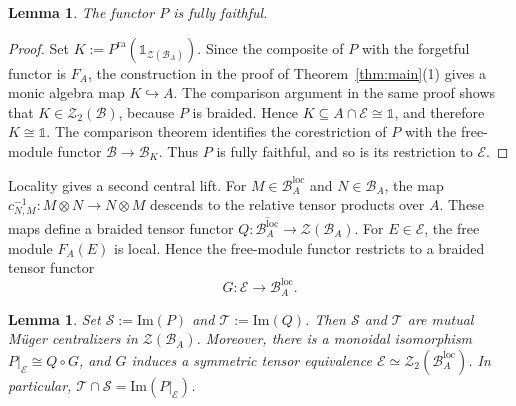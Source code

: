 \documentclass[10pt,a4paper]{amsart}
\numberwithin{equation}{section}
\newtheorem{lemma}[thmctr]{Lemma}
\newcommand{\unit}{\mathds{1}}
\newcommand{\B}{\mathcal{B}}
\newcommand{\C}{\mathcal{C}}
\newcommand{\E}{\mathcal{E}}
\newcommand{\Z}{\mathcal{Z}}
\newcommand{\T}{\mathcal{T}}
\newcommand{\cS}{\mathcal{S}}
\newcommand{\loc}{\mathrm{loc}}
\newcommand{\ra}{\mathrm{ra}}
\newcommand{\im}{\mathrm{Im}}
\begin{document}
\begin{lemma}\label{lem:relative-positive-lift}
The functor $P$ is fully faithful. 
\end{lemma}

\begin{proof}
Set $K:=P^{\ra}(\unit_{\Z(\B_A)})$. Since the composite of $P$ with the
forgetful functor is $F_A$, the construction in the proof of
Theorem~\ref{thm:main}(1) gives a monic algebra map $K\hookrightarrow A$.
The comparison argument in the same proof shows that $K\in\Z_2(\B)$,
because $P$ is braided. Hence $K\subseteq A\cap\E\cong\unit$, and therefore
$K\cong\unit$. The comparison theorem
\cite[Proposition~6.6]{shimizu2026commutative} identifies the corestriction
of $P$ with the free-module functor $\B\to\B_K$. Thus $P$ is fully faithful,
and so is its restriction to $\E$.
\end{proof}

Locality gives a second central lift. For $M\in\B_A^\loc$ and $N\in\B_A$, the map
$c_{N,M}^{-1}:M\otimes N\to N\otimes M$ descends to the relative tensor
products over $A$. These maps define a braided tensor functor $Q:\overline{\B_A^\loc}\longrightarrow\Z(\B_A)$. 
For $E\in\E$, the free module $F_A(E)$ is local. Hence the free-module
functor restricts to a braided tensor functor
\[
  G:\E\longrightarrow\B_A^\loc.
\]

\begin{lemma}\label{lem:relative-mutual-centralizers}
Set $\cS:=\im(P)$ and $\T:=\im(Q)$. Then $\cS$ and $\T$ are mutual
M\"uger centralizers in $\Z(\B_A)$.
Moreover, there is a monoidal isomorphism $P|_{\E}\cong Q\circ G$, 
and $G$ induces a symmetric tensor equivalence
$\E\simeq\Z_2(\B_A^\loc)$. 
In particular, $\T\cap\cS=\im(P |_\E)$.
\end{lemma}
\end{document}
